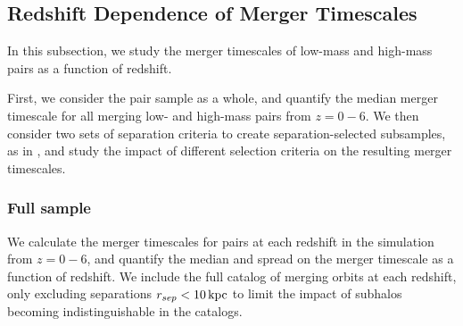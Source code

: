 \documentclass[twocolumn,linenumbers]{aastex631}
\newcommand{\chambe}{\citet{Chamberlain2024}}
\begin{document}
    
    
    
    
\subsection{Redshift Dependence of Merger Timescales}\label{sec:results-timevredshift}
    In this subsection, we study the merger timescales of low-mass and high-mass pairs as a function of redshift. 
    
    First, we consider the pair sample as a whole, and quantify the median merger timescale for all merging low- and high-mass pairs from $z=0-6$. 
    We then consider two sets of separation criteria to create separation-selected subsamples, as in \chambe{}, and study the impact of different selection criteria on the resulting merger timescales. 
    

    \subsubsection{Full sample}
        We calculate the merger timescales for pairs at each redshift in the simulation from $z=0-6$, and quantify the median and spread on the merger timescale as a function of redshift. 
        We include the full catalog of merging orbits at each redshift, only excluding separations $r_{sep}<10\mathrm{\,kpc}$ to limit the impact of subhalos becoming indistinguishable in the \subfind{} catalogs.%
\end{document}
